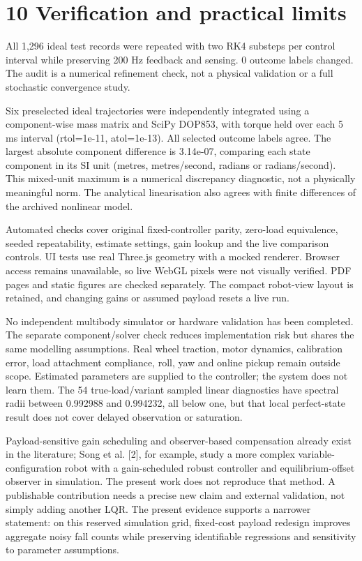 \documentclass[11pt,a4paper]{article}
\begin{document}
\clearpage
\section*{10 Verification and practical limits}
All 1,296 ideal test records were repeated with two RK4 substeps per control interval while preserving 200 Hz feedback and sensing. 0 outcome labels changed. The audit is a numerical refinement check, not a physical validation or a full stochastic convergence study.

Six preselected ideal trajectories were independently integrated using a component-wise mass matrix and SciPy DOP853, with torque held over each 5 ms interval (rtol=1e-11, atol=1e-13). All selected outcome labels agree. The largest absolute component difference is 3.14e-07, comparing each state component in its SI unit (metres, metres/second, radians or radians/second). This mixed-unit maximum is a numerical discrepancy diagnostic, not a physically meaningful norm. The analytical linearisation also agrees with finite differences of the archived nonlinear model.

Automated checks cover original fixed-controller parity, zero-load equivalence, seeded repeatability, estimate settings, gain lookup and the live comparison controls. UI tests use real Three.js geometry with a mocked renderer. Browser access remains unavailable, so live WebGL pixels were not visually verified. PDF pages and static figures are checked separately. The compact robot-view layout is retained, and changing gains or assumed payload resets a live run.

No independent multibody simulator or hardware validation has been completed. The separate component/solver check reduces implementation risk but shares the same modelling assumptions. Real wheel traction, motor dynamics, calibration error, load attachment compliance, roll, yaw and online pickup remain outside scope. Estimated parameters are supplied to the controller; the system does not learn them. The 54 true-load/variant sampled linear diagnostics have spectral radii between 0.992988 and 0.994232, all below one, but that local perfect-state result does not cover delayed observation or saturation.

Payload-sensitive gain scheduling and observer-based compensation already exist in the literature; Song et al. [2], for example, study a more complex variable-configuration robot with a gain-scheduled robust controller and equilibrium-offset observer in simulation. The present work does not reproduce that method. A publishable contribution needs a precise new claim and external validation, not simply adding another LQR. The present evidence supports a narrower statement: on this reserved simulation grid, fixed-cost payload redesign improves aggregate noisy fall counts while preserving identifiable regressions and sensitivity to parameter assumptions.
\end{document}
